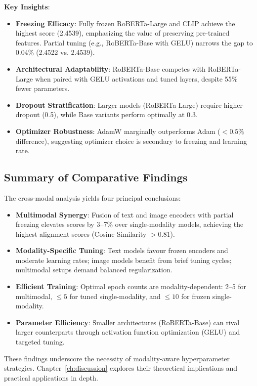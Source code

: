 \noindent \textbf{Key Insights}:
\begin{itemize}
    \item \textbf{Freezing Efficacy}: Fully frozen RoBERTa-Large and CLIP achieve the highest score (2.4539), emphasizing the value of preserving pre-trained features. Partial tuning (e.g., RoBERTa-Base with GELU) narrows the gap to 0.04\% (2.4522 vs. 2.4539).
    \item \textbf{Architectural Adaptability}: RoBERTa-Base competes with RoBERTa-Large when paired with GELU activations and tuned layers, despite 55\% fewer parameters.
    \item \textbf{Dropout Stratification}: Larger models (RoBERTa-Large) require higher dropout (0.5), while Base variants perform optimally at 0.3.
    \item \textbf{Optimizer Robustness}: AdamW marginally outperforms Adam ($<0.5\%$ difference), suggesting optimizer choice is secondary to freezing and learning rate.
\end{itemize}

\subsection{Summary of Comparative Findings}

The cross-modal analysis yields four principal conclusions:
\begin{itemize}
    \item \textbf{Multimodal Synergy}: Fusion of text and image encoders with partial freezing elevates scores by 3--7\% over single-modality models, achieving the highest alignment scores (Cosine Similarity $>0.81$).
    \item \textbf{Modality-Specific Tuning}: Text models favour frozen encoders and moderate learning rates; image models benefit from brief tuning cycles; multimodal setups demand balanced regularization.
    \item \textbf{Efficient Training}: Optimal epoch counts are modality-dependent: 2--5 for multimodal, $\le5$ for tuned single-modality, and $\le10$ for frozen single-modality.
    \item \textbf{Parameter Efficiency}: Smaller architectures (RoBERTa-Base) can rival larger counterparts through activation function optimization (GELU) and targeted tuning.
\end{itemize}

These findings underscore the necessity of modality-aware hyperparameter strategies. Chapter~\ref{ch:discussion} explores their theoretical implications and practical applications in depth.



